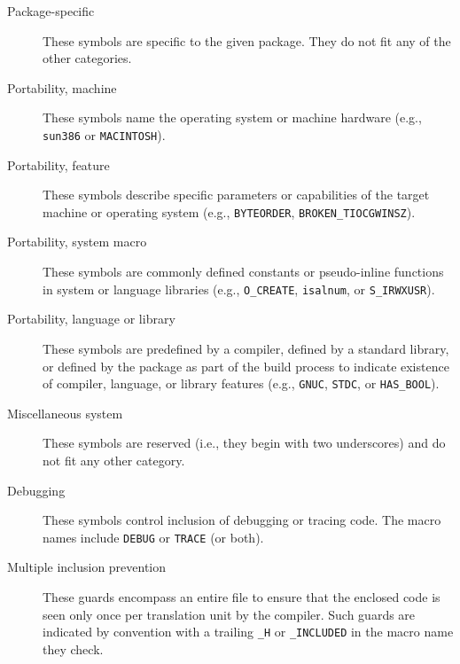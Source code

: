 \documentclass[10pt]{article}
\begin{document}
\begin{description}

\item[Package-specific] 
  These symbols are specific to the given package.  They do not fit any of
  the other categories.

\item[Portability, machine]
  These symbols name the operating system or machine
  hardware (e.g., \texttt{sun386} or \texttt{MACINTOSH}).
      
\item[Portability, feature] These symbols describe specific parameters
      or capabilities of the target machine or operating system (e.g.,
      \texttt{BYTEORDER}, \verb|BROKEN_TIOCGWINSZ|).  
      

\item[Portability, system macro]
  These symbols are commonly defined constants or
  pseudo-inline functions in system or language libraries (e.g.,
  \verb|O_CREATE|, \texttt{isalnum}, or \verb|S_IRWXUSR|).

\item[Portability, language or library]
  These symbols are predefined by a compiler, defined by a standard
  library, or defined by the package as part of the build
  process to indicate existence of compiler, language, or library features
  (e.g., \texttt{GNUC}, \texttt{STDC}, or \verb|HAS_BOOL|).

\item[Miscellaneous system]
  These symbols are reserved (i.e., they begin with two underscores) and do
  not fit any other category.
      
\item[Debugging]
  These symbols control inclusion of debugging or tracing code.  The macro
  names include \texttt{DEBUG} or \texttt{TRACE} (or both).
      
\item[Multiple inclusion prevention]
  These guards encompass an entire file to ensure that the enclosed code is
  seen only once per translation unit by the compiler.  Such guards are
  indicated by convention with a trailing \verb|_H| or \verb|_INCLUDED| in the macro name
  they check.
\end{description}
\end{document}
